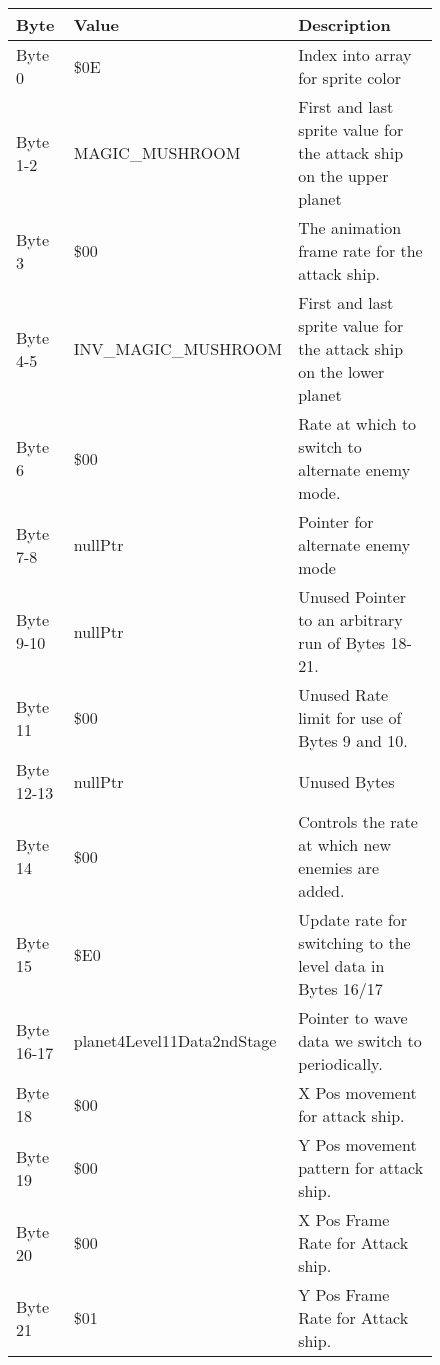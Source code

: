 \begin{figure}[H]
{\begin{adjustbox}{width=12cm}
\begin{tabular}{lll}
\toprule
 Byte       & Value                      & Description                                                         \\
\midrule
 Byte 0     & \$0E                        & Index into array for sprite color                                   \\
 Byte 1-2   & MAGIC\_MUSHROOM             & First and last sprite value for the attack ship on the upper planet \\
 Byte 3     & \$00                        & The animation frame rate for the attack ship.                       \\
 Byte 4-5   & INV\_MAGIC\_MUSHROOM         & First and last sprite value for the attack ship on the lower planet \\
 Byte 6     & \$00                        & Rate at which to switch to alternate enemy mode.                    \\
 Byte 7-8   & nullPtr                    & Pointer for alternate enemy mode                                    \\
 Byte 9-10  & nullPtr                    & Unused Pointer to an arbitrary run of Bytes 18-21.                  \\
 Byte 11    & \$00                        & Unused Rate limit for use of Bytes 9 and 10.                        \\
 Byte 12-13 & nullPtr                    & Unused Bytes                                                        \\
 Byte 14    & \$00                        & Controls the rate at which new enemies are added.                   \\
 Byte 15    & \$E0                        & Update rate for switching to the level data in Bytes 16/17          \\
 Byte 16-17 & planet4Level11Data2ndStage & Pointer to wave data we switch to periodically.                     \\
 Byte 18    & \$00                        & X Pos movement for attack ship.                                     \\
 Byte 19    & \$00                        & Y Pos movement pattern for attack ship.                             \\
 Byte 20    & \$00                        & X Pos Frame Rate for Attack ship.                                   \\
 Byte 21    & \$01                        & Y Pos Frame Rate for Attack ship.                                   \\

\end{tabular}
\end{adjustbox}}
\end{figure}
